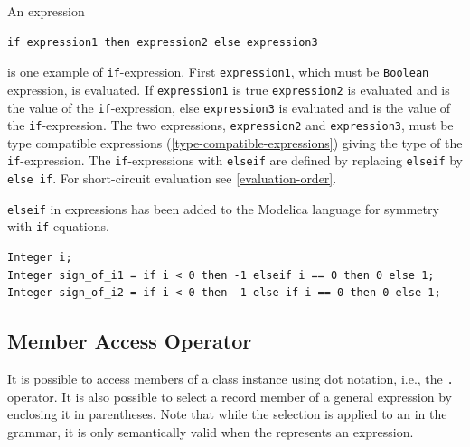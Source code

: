 An expression
\begin{lstlisting}[language=modelica]
if expression1 then expression2 else expression3
\end{lstlisting}%
 is one example of \lstinline!if!-expression.
First \lstinline!expression1!, which must be \lstinline!Boolean! expression, is evaluated.
If \lstinline!expression1! is true \lstinline!expression2! is evaluated and is the value of the \lstinline!if!-expression, else \lstinline!expression3! is evaluated and is the value of the \lstinline!if!-expression.
The two expressions, \lstinline!expression2! and \lstinline!expression3!, must be type compatible expressions (\cref{type-compatible-expressions}) giving the type of the \lstinline!if!-expression.
The \lstinline!if!-expressions with \lstinline!elseif! are defined by replacing \lstinline!elseif! by \lstinline!else if!.
For short-circuit evaluation see \cref{evaluation-order}.

\begin{nonnormative}
\lstinline!elseif! in expressions has been added to the Modelica language for symmetry with \lstinline!if!-equations.
\end{nonnormative}

\begin{example}
\begin{lstlisting}[language=modelica]
Integer i;
Integer sign_of_i1 = if i < 0 then -1 elseif i == 0 then 0 else 1;
Integer sign_of_i2 = if i < 0 then -1 else if i == 0 then 0 else 1;
\end{lstlisting}
\end{example}

\subsection{Member Access Operator}\label{member-access-operator}

It is possible to access members of a class instance using dot notation, i.e., the \lstinline!.! operator.
It is also possible to select a record member of a general expression by enclosing it in parentheses.
Note that while the selection is applied to an  in the grammar, it is only semantically valid when the  represents an expression.


